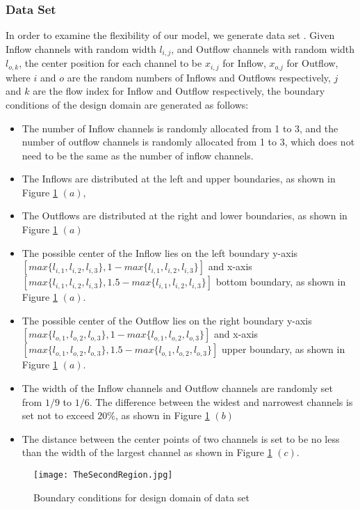 \documentclass{article}
\begin{document}
\subsubsection{Data Set \uppercase\expandafter{}}
In order to examine the flexibility of our model, we generate data set \uppercase\expandafter{}. Given Inflow channels with random width $l_{i,j}$,  and Outflow channels with random width $l_{o,k}$, the center position for each channel to be $x_{i,j}$ for Inflow, $x_{o.j}$ for Outflow, where $i$ and $o$ are the random numbers of Inflows and Outflows respectively, $j$ and $k$ are the flow index for Inflow and Outflow respectively, the boundary conditions of the design domain are generated as follows:
\begin{itemize}
\item The number of Inflow channels is randomly allocated from 1 to 3, and the number of outflow channels is randomly allocated from 1 to 3, which does not need to be the same as the number of inflow channels.
\item The Inflows are distributed at the left and upper boundaries, as shown in Figure \ref{fig::RegionBgin2} $(a)$,
\item The Outflows are distributed at the right and lower boundaries, as shown in Figure \ref{fig::RegionBgin2} $(a)$
\item The possible center of the Inflow lies on the left boundary y-axis $ \left[max\{l_{i,1}, l_{i,2}, l_{i,3}\}, 1 - max\{l_{i,1}, l_{i,2}, l_{i,3}\}\right]$ and x-axis $\left[max\{l_{i,1}, l_{i,2}, l_{i,3}\}, 1.5 - max\{l_{i,1}, l_{i,2}, l_{i,3}\}\right]$ bottom boundary, as shown in Figure \ref{fig::RegionBgin2} $(a)$.
\item The possible center of the Outflow lies on the right boundary y-axis $\left[max\{l_{o,1}, l_{o,2}, l_{o,3}\}, 1 -  max\{l_{o,1}, l_{o,2}, l_{o,3}\}\right]$ and x-axis $[max\{l_{o,1}, l_{o,2}, l_{o,3}\}, 1.5 - max\{l_{o,1}, l_{o,2}, l_{o,3}\}]$ upper boundary, as shown in Figure \ref{fig::RegionBgin2} $(a)$.
\item The width of the Inflow channels and Outflow channels are randomly set from $1/9$ to $1/6$. The difference between the widest and narrowest channels is set not to exceed $20\%$, as shown in Figure \ref{fig::RegionBgin2} $(b)$
\item The distance between the center points of two channels is set to be no less than the width of the largest channel as shown in Figure \ref{fig::RegionBgin2} $(c)$.
\end{itemize}
\begin{figure}
    \centering
    \texttt{[image: TheSecondRegion.jpg]}
    \caption{Boundary conditions for design domain of data set \uppercase\expandafter{}}
    \label{fig::RegionBgin2}
\end{figure}
\end{document}
